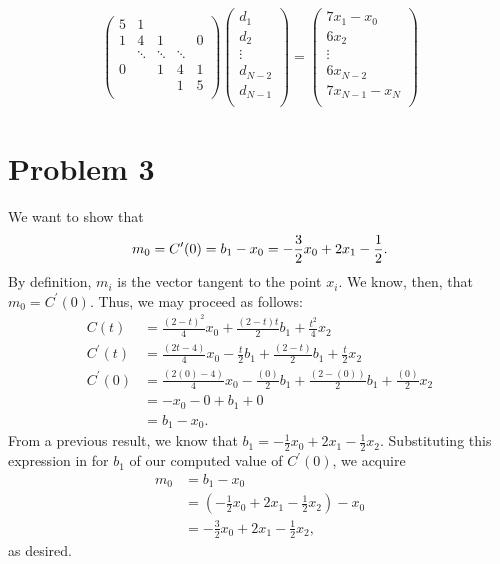 \documentclass[paper=a4, fontsize=11pt]{scrartcl} %
\begin{document}
\begin{align*}
    \begin{pmatrix}
        5 & 1 \\
        1 & 4 & 1 & & 0\\
          & \ddots & \ddots & \ddots \\
        0 & & 1 & 4 & 1\\
          & &   & 1 & 5\\
    \end{pmatrix} \begin{pmatrix}
        d_{1}\\
        d_{2}\\
        \vdots\\
        d_{N-2}\\
        d_{N-1}\\
    \end{pmatrix} = \begin{pmatrix}
        7x_{1} - x_{0}\\
        6x_{2}\\
        \vdots\\
        6x_{N-2}\\
        7x_{N-1} - x_{N}\\
    \end{pmatrix}
\end{align*}

\section*{Problem 3}
We want to show that
\begin{equation}
    m_0 = C^\prime (0) = b_1 - x_0 = - \frac{3}{2}x_0 +2x_1 - \frac{1}{2}. \notag
\end{equation}
By definition, $m_i$ is the vector tangent to the point $x_i$. We know, then,
that $m_0 = C^\prime(0)$. Thus, we may proceed as follows:
\begin{align*}
    C(t) &= \frac{(2 - t)^2}{4} x_0 + \frac{(2-t)t}{2} b_1 + \frac{t^2}{4}x_2 \\
    C^\prime (t) &= \frac{(2t - 4)}{4}x_0 - \frac{t}{2}b_1 + \frac{(2-t)}{2}b_1 + \frac{t}{2}x_2 \\
    C^\prime(0) &= \frac{(2(0) - 4)}{4}x_0 - \frac{(0)}{2}b_1 + \frac{(2-(0))}{2}b_1 + \frac{(0)}{2}x_2 \\
                &= -x_0 -0 + b_1 +0 \\
                &= b_1 - x_0.
\end{align*}
From a previous result, we know that $b_1 = -\frac{1}{2}x_0 + 2x_1
-\frac{1}{2}x_2$. Substituting this expression in for $b_1$ of our computed
value of $C^\prime(0)$, we acquire
\begin{align*}
    m_0 &= b_1 - x_0 \\
        &= (-\frac{1}{2}x_0 + 2x_1 -\frac{1}{2}x_2) - x_0 \\
        &= -\frac{3}{2}x_0 + 2x_1 -\frac{1}{2}x_2 ,
\end{align*}
as desired.
\end{document}
